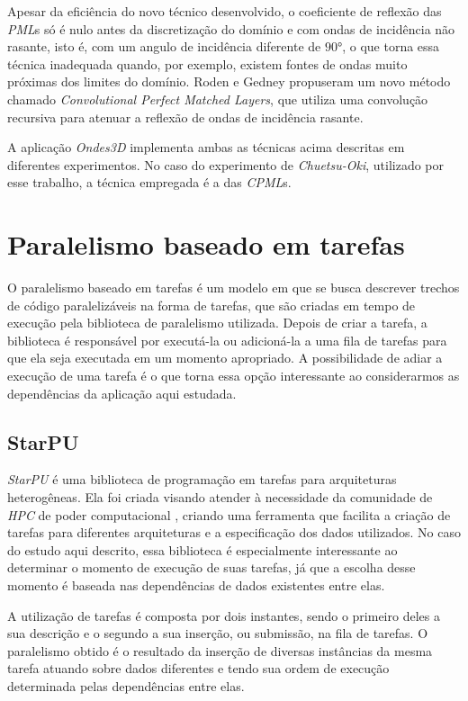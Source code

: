 \documentclass[cic,tc]{iiufrgs}
\begin{document}
Apesar da eficiência do novo técnico desenvolvido, o coeficiente de reflexão das \textit{PML}s só é nulo antes da discretização do domínio e com ondas de incidência não rasante,
isto é, com um angulo de incidência diferente de $90$°, o que torna essa técnica inadequada quando, por exemplo, existem fontes de ondas muito próximas dos limites do domínio. Roden e
Gedney \cite{CPML} propuseram um novo método chamado \textit{Convolutional Perfect Matched Layers}, que utiliza uma convolução recursiva para atenuar a reflexão de ondas de incidência rasante.

A aplicação \textit{Ondes3D} implementa ambas as técnicas acima descritas em diferentes experimentos. No caso do experimento de \textit{Chuetsu-Oki}, utilizado por esse trabalho, a técnica
empregada é a das \textit{CPML}s.


\section{Paralelismo baseado em tarefas}

O paralelismo baseado em tarefas é um modelo em que se busca descrever trechos de código paralelizáveis na forma de tarefas, que são criadas em tempo de execução pela biblioteca de
paralelismo utilizada. Depois de criar a tarefa, a biblioteca é responsável por executá-la ou adicioná-la a uma fila de tarefas para que ela seja executada em um momento apropriado.
A possibilidade de adiar a execução de uma tarefa é o que torna essa opção interessante ao considerarmos as dependências da aplicação aqui estudada.

\subsection{StarPU}

\textit{StarPU} é uma biblioteca de programação em tarefas para arquiteturas heterogêneas. Ela foi criada visando atender à necessidade da comunidade de \textit{HPC} de
poder computacional \cite{StarPU}, criando uma ferramenta que facilita a criação de tarefas para diferentes arquiteturas e a especificação dos dados utilizados. No caso do estudo aqui
descrito, essa biblioteca é especialmente interessante ao determinar o momento de execução de suas tarefas, já que a escolha desse momento é baseada nas dependências de dados
existentes entre elas.

A utilização de tarefas é composta por dois instantes, sendo o primeiro deles a sua descrição e o segundo a sua inserção, ou submissão, na fila de tarefas. O paralelismo obtido
é o resultado da inserção de diversas instâncias da mesma tarefa atuando sobre dados diferentes e tendo sua ordem de execução determinada pelas dependências entre elas.
\end{document}

